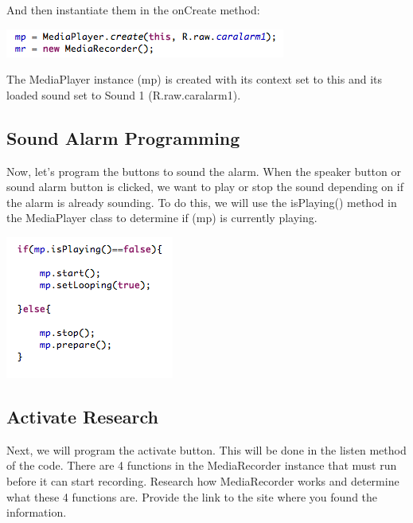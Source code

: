 \noindent	
And then instantiate them in the onCreate method:\\

\begin{center}

\includegraphics[scale=1]{instantiate.png} 

\end{center}

\noindent
The MediaPlayer instance (mp) is created with its context set to this and its loaded sound set to Sound 1 (R.raw.caralarm1).

\subsection{Sound Alarm Programming}
Now, let's program the buttons to sound the alarm. When the speaker button or sound alarm button is clicked, we want to play or stop the sound depending on if the alarm is already sounding. To do this, we will use the isPlaying() method in the MediaPlayer class to determine if (mp) is currently playing.\\

\begin{center}

\includegraphics[scale=1]{ifelseSound.png} 

\end{center}

\subsection{Activate Research}
Next, we will program the activate button. This will be done in the listen method of the code. There are 4 functions in the MediaRecorder instance that must run before it can start recording. Research how MediaRecorder works and determine what these 4 functions are. Provide the link to the site where you found the information.

